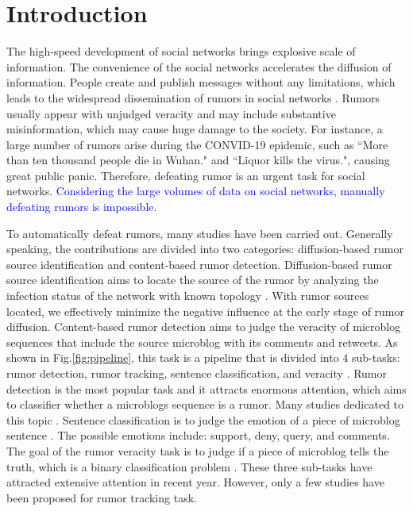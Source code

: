 \section{Introduction}
\label{sec:introduction}
The high-speed development of social networks brings explosive scale of information. The convenience of the social networks accelerates the diffusion of information. People create and publish messages without any limitations, which leads to the widespread dissemination of rumors in social networks \cite{DBLP:journals/corr/KurkaGZ15, DBLP:journals/csur/ZubiagaABLP18, DBLP:conf/sirocco/KostkaOW08, vosoughi2018spread}. Rumors usually appear with unjudged veracity and may include substantive misinformation, which may cause huge damage to the society. For instance, a large number of rumors arise during the CONVID-19 epidemic, such as ``More than ten thousand people die in Wuhan." and ``Liquor kills the virus.", causing great public panic. Therefore, defeating rumor is an urgent task for social networks. \textcolor{blue}{Considering the large volumes of data on social networks, manually defeating rumors is impossible. }

To automatically defeat rumors, many studies have been carried out. Generally speaking, the contributions are divided into two categories:  diffusion-based rumor source identification and content-based rumor detection. Diffusion-based rumor source identification aims to locate the source of the rumor by analyzing the infection status of the network with known topology \cite{DBLP:conf/sigmetrics/ShahZ10, DBLP:journals/tit/ShahZ11, DBLP:conf/kdd/LappasTGM10}. With rumor sources located, we effectively minimize the negative influence at the early stage of rumor diffusion. Content-based rumor detection aims to judge the veracity of microblog sequences that include the source microblog with its comments and retweets. As shown in Fig.\ref{fig:pipeline}, this task is a pipeline that is divided into 4 sub-tasks: rumor detection, rumor tracking, sentence classification, and veracity \cite{DBLP:journals/csur/ZubiagaABLP18, DBLP:conf/coling/KochkinaLZ18}. Rumor detection is the most popular task and it attracts enormous attention, which aims to classifier whether a microblogs sequence is a rumor. Many studies dedicated to this topic \cite{DBLP:conf/socinfo/ZubiagaLP17, DBLP:conf/www/Ma0W19,DBLP:conf/naacl/NguyenDCD19, DBLP:journals/corr/abs-1906-05659}. Sentence classification is to judge the emotion of a piece of microblog sentence \cite{DBLP:conf/semeval/EnayetE17, DBLP:conf/semeval/X17a, DBLP:conf/coling/ZubiagaKLPL16}. The possible emotions include: support, deny, query, and comments. The goal of the rumor veracity task is to judge if a piece of microblog tells the truth, which is a binary classification problem \cite{DBLP:conf/coling/KochkinaLZ18, DBLP:conf/acl/LiZS19, DBLP:conf/acl/KumarC19}. These three sub-tasks have attracted extensive attention in recent year. However, only a few studies have been proposed for rumor tracking task.

